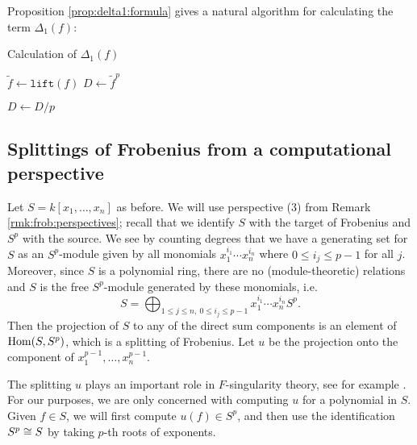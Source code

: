 Proposition \ref{prop:delta1:formula} gives a natural algorithm
for calculating the term \(\Delta_{1}(f)\): 


\begin{algorithm}[H]
\label{alg:calc:delta1}
\caption{Calculation of \(\Delta_{1}(f)\) }

$\tilde{f} \gets \texttt{lift}(f)$\;
$D \gets \tilde{f}^p$\;


$D \gets D / p$

\end{algorithm}

\subsection{Splittings of Frobenius from a computational perspective}

Let \(S = k[x_{1}, \ldots, x_{n}]\) as before. 
We will use perspective (3) from
Remark \ref{rmk:frob:perspectives}; 
recall that we identify 
\(S\) with the target of Frobenius and
\(S^{p}\) with the source.
We see 
by counting degrees
that we have a generating set for \(S\) as an
\(S^{p}\)-module given by
all monomials
\(x_{1}^{i_{1}}\cdots x_{n}^{i_{n}}\)
where \(0 \leq i_{j} \leq p-1\) for all \(j\).
Moreover, since \(S\) is a polynomial ring, 
there are no (module-theoretic) relations
and
\(S\) is the free \(S^{p}\)-module generated by 
these monomials, i.e.  \[
S = \bigoplus_{1 \leq j \leq n,~ 0 \leq i_{j} \leq p-1}^{} x_{1}^{i_{1}}\cdots x_{n}^{i_{n}} S^{p}
.\] 
Then the projection of \(S\) to any of the direct sum components
is an element of \(\operatorname{Hom}(S,S^{p})\), which is a
splitting of Frobenius.
Let \(u\) be the projection onto the component of
\(x_{1}^{p-1}, \ldots, x_{n}^{p-1}\).

The splitting \(u\) plays an important role in \(F\)-singularity
theory, see for example 
\cite[Claim~2.6]{ma-polstra-2021-F-sing-comm-alg}.
For our purposes, we are only concerned with computing \(u\) 
for a polynomial in \(S\). 
Given \(f \in S\), we will first compute
\(u(f) \in S^{p}\), and then use the identification
\(S^{p} \cong S\) by taking \(p\)-th roots of 
exponents.


